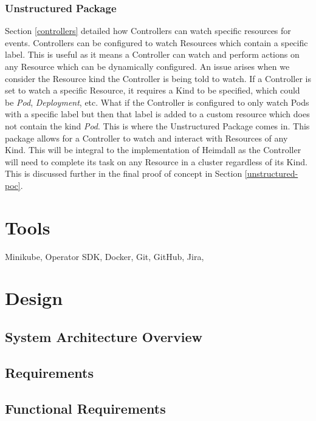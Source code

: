 \documentclass{article}
\begin{document}
\subsubsection{Unstructured Package}

Section \ref{controllers} detailed how Controllers can watch specific resources for events. Controllers can be configured to watch Resources which contain a specific label. This is useful as it means a Controller can watch and perform actions on any Resource which can be dynamically configured. An issue arises when we consider the Resource kind the Controller is being told to watch. If a Controller is set to watch a specific Resource, it requires a Kind to be specified, which could be \emph{Pod}, \emph{Deployment}, etc. What if the Controller is configured to only watch Pods with a specific label but then that label is added to a custom resource which does not contain the kind \emph{Pod}. This is where the Unstructured Package comes in. This package allows for a Controller to watch and interact with Resources of any Kind. This will be integral to the implementation of Heimdall as the Controller will need to complete its task on any Resource in a cluster regardless of its Kind. This is discussed further in the final proof of concept in Section \ref{unstructured-poc}.



\section{Tools}
Minikube, Operator SDK, Docker, Git, GitHub, Jira, 



\section{Design}



\subsection{System Architecture Overview}



\subsection{Requirements}



\subsection{Functional Requirements}
\end{document}

